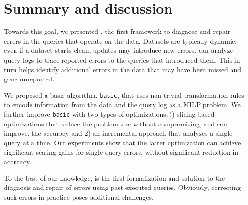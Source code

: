 
\section{Summary and discussion}


Towards this goal, we presented \sys, the first framework to diagnose and
repair errors in the queries that operate on the data.
Datasets are typically dynamic: even if a dataset starts clean,
updates may introduce new errors. \sys can
analyze query logs to trace reported errors to the queries that
introduced them. This in turn helps identify additional errors
in the data that may have been missed and gone unreported.

We proposed a basic algorithm, \texttt{basic}, that uses non-trivial transformation rules to
encode information from the data and the query log as a MILP problem. We further improve 
\texttt{basic} with two types of optimizations: 
!) slicing-based optimizations that reduce the problem
size without compromising, and can improve, the accuracy and 
2) an incremental approach that analyzes a single query at a time. 
Our experiments show that the latter
optimization can achieve significant scaling gains for single-query
errors, without significant reduction in accuracy.

To the best of our knowledge, \sys is the first formalization and solution to the diagnosis
and repair of errors using past executed queries. 
Obviously, correcting such errors in practice poses additional challenges. 



